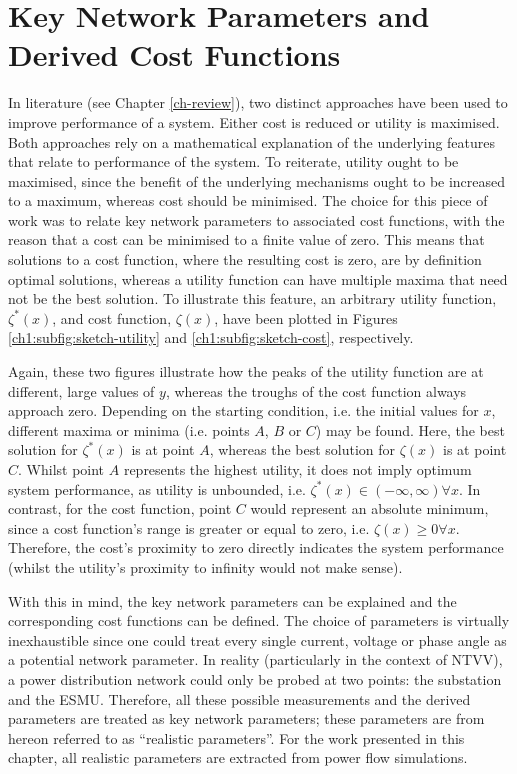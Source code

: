 \section{Key Network Parameters and Derived Cost Functions}
\label{ch1:sec:key-network-parameters}

In literature (see Chapter \ref{ch-review}), two distinct approaches have been used to improve performance of a system.
Either cost is reduced or utility is maximised.
Both approaches rely on a mathematical explanation of the underlying features that relate to performance of the system.
To reiterate, utility ought to be maximised, since the benefit of the underlying mechanisms ought to be increased to a maximum, whereas cost should be minimised.
The choice for this piece of work was to relate key network parameters to associated cost functions, with the reason that a cost can be minimised to a finite value of zero.
This means that solutions to a cost function, where the resulting cost is zero, are by definition optimal solutions, whereas a utility function can have multiple maxima that need not be the best solution.
To illustrate this feature, an arbitrary utility function, $\zeta^{*}(x)$, and cost function, $\zeta(x)$, have been plotted in Figures \ref{ch1:subfig:sketch-utility} and \ref{ch1:subfig:sketch-cost}, respectively.



Again, these two figures illustrate how the peaks of the utility function are at different, large values of $y$, whereas the troughs of the cost function always approach zero.
Depending on the starting condition, i.e. the initial values for $x$, different maxima or minima (i.e. points $A$, $B$ or $C$) may be found.
Here, the best solution for $\zeta^{*}(x)$ is at point $A$, whereas the best solution for $\zeta(x)$ is at point $C$.
Whilst point $A$ represents the highest utility, it does not imply optimum system performance, as utility is unbounded, i.e. $\zeta^{*}(x) \in (-\infty, \infty) \forall x$.
In contrast, for the cost function, point $C$ would represent an absolute minimum, since a cost function's range is greater or equal to zero, i.e. $\zeta(x) \geq 0 \forall x$.
Therefore, the cost's proximity to zero directly indicates the system performance (whilst the utility's proximity to infinity would not make sense).

With this in mind, the key network parameters can be explained and the corresponding cost functions can be defined.
The choice of parameters is virtually inexhaustible since one could treat every single current, voltage or phase angle as a potential network parameter.
In reality (particularly in the context of NTVV), a power distribution network could only be probed at two points: the substation and the ESMU.
Therefore, all these possible measurements and the derived parameters are treated as key network parameters; these parameters are from hereon referred to as ``realistic parameters''.
For the work presented in this chapter, all realistic parameters are extracted from power flow simulations.

